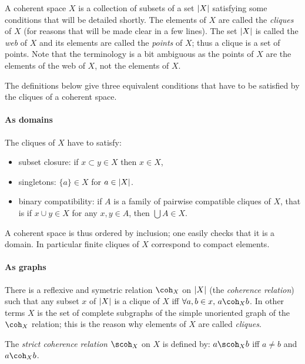 A coherent space \(X\) is a collection of subsets of a set \(\left|X\right|\)
satisfying some conditions that will be detailed shortly. The elements
of \(X\) are called the \emph{cliques} of \(X\) (for reasons that will
be made clear in a few lines). The set \(\left|X\right|\) is called the
\emph{web} of \(X\) and its elements are called the \emph{points} of
\(X\); thus a clique is a set of points. Note that the terminology is a
bit ambiguous as the points of \(X\) are the elements of the web of
\(X\), not the elements of \(X\).

The definitions below give three equivalent conditions that have to be
satisfied by the cliques of a coherent space.

\paragraph{As domains}\label{as-domains}

The cliques of \(X\) have to satisfy:

\begin{itemize}
\tightlist
\item
  subset closure: if \(x\subset y\in X\) then \(x\in X\),
\item
  singletons: \(\{a\}\in X\) for \(a\in\left|X\right|\).
\item
  binary compatibility: if \(A\) is a family of pairwise compatible
  cliques of \(X\), that is if \(x\cup y\in X\) for any \(x,y\in A\),
  then \(\bigcup A\in X\).
\end{itemize}

A coherent space is thus ordered by inclusion; one easily checks that it
is a domain. In particular finite cliques of \(X\) correspond to compact
elements.

\paragraph{As graphs}\label{as-graphs}

There is a reflexive and symetric relation \(\coh_X\) on \(\left|X\right|\) (the
\emph{coherence relation}) such that any subset \(x\) of \(\left|X\right|\) is a
clique of \(X\) iff \(\forall a,b\in x,\, a\coh_X b\). In other terms
\(X\) is the set of complete subgraphs of the simple unoriented graph of
the \(\coh_X\) relation; this is the reason why elements of \(X\) are
called \emph{cliques}.

The \emph{strict coherence relation} \(\scoh_X\) on \(X\) is defined by:
\(a\scoh_X b\) iff \(a\neq b\) and \(a\coh_X b\).

